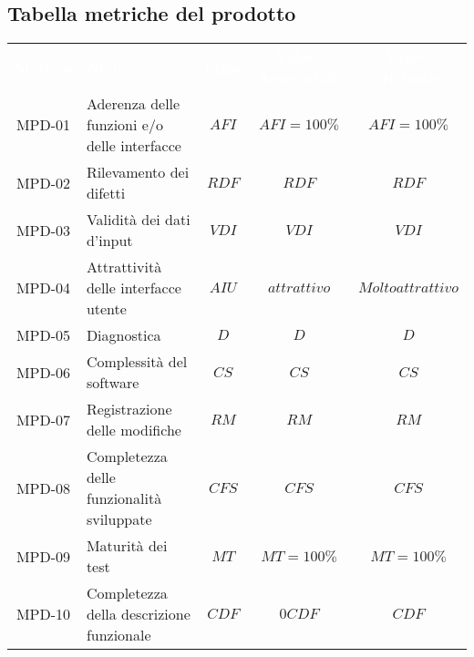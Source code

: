             \subsection{Tabella metriche del prodotto}
    \renewcommand{\arraystretch}{1.5}
    \begin{longtable}{ c C{4cm} c c c}
    \textcolor{white}{\textbf{Metrica}} & \textcolor{white}{\textbf{Nome}} & \textcolor{white}{\textbf{Sigla}} & \textcolor{white}{\textbf{Valore Accettabile}} & \textcolor{white}{\textbf{Valore Ottimale}}\\
    MPD-01 & Aderenza delle funzioni e/o delle interfacce & $AFI$ & $AFI=100\%$ & $AFI=100\%$ \\
    MPD-02 & Rilevamento dei difetti & $RDF$ & $ RDF $ & $RDF$ \\
    MPD-03 & Validità dei dati d'input & $VDI$ &  $VDI $ &  $VDI$ \\
    MPD-04 & Attrattività delle interfacce utente & $AIU$ & $attrattivo$ &  $Molto attrattivo$ \\
    MPD-05 & Diagnostica & $D$ & $D $ & $D $ \\
    MPD-06 & Complessità del software & $CS$ & $CS$ & $CS$ \\
    MPD-07 & Registrazione delle modifiche & $RM$ & $RM$ & $RM$ \\
    MPD-08 & Completezza delle funzionalità sviluppate & $CFS$ & $CFS$ & $CFS$  \\
    MPD-09 & Maturità dei test & $MT$ & $MT=100\% $ & $MT=100\%$  \\	
    MPD-10 & Completezza della descrizione funzionale& $CDF$ & $0CDF$ & $CDF$  \\
    \end{longtable}  
                
       
                 
       
       
